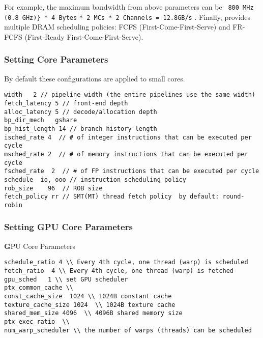 For example, the maximum bandwidth from above parameters can be
\Verb+ 800 MHz (0.8 GHz)} * 4 Bytes+
  \Verb+* 2 MCs * 2 Channels = 12.8GB/s+ . Finally, \SIM provides
  multiple DRAM scheduling policies: FCFS (First-Come-First-Serve) and
  FR-FCFS (First-Ready First-Come-First-Serve).


\subsubsection{Setting \cpu Core Parameters}

By default these configurations are applied to small cores. 

\begin{Verbatim}
width   2 // pipeline width (the entire pipelines use the same width) 
fetch_latency 5 // front-end depth 
alloc_latency 5 // decode/allocation depth  
bp_dir_mech   gshare 
bp_hist_length 14 // branch history length 
isched_rate 4  // # of integer instructions that can be executed per cycle 
msched_rate 2  // # of memory instructions that can be executed per cycle 
fsched_rate  2  // # of FP instructions that can be executed per cycle 
schedule  io, ooo // instruction scheduling policy 
rob_size    96  // ROB size
fetch_policy rr // SMT(MT) thread fetch policy  by default: round-robin 
\end{Verbatim}


\subsubsection{Setting GPU Core Parameters}
{\textbf GPU Core Parameters} 



\begin{Verbatim}
schedule_ratio 4 \\ Every 4th cycle, one thread (warp) is scheduled 
fetch_ratio  4 \\ Every 4th cycle, one thread (warp) is fetched 
gpu_sched   1 \\ set GPU scheduler 
ptx_common_cache \\ 
const_cache_size  1024 \\ 1024B constant cache  
texture_cache_size 1024  \\ 1024B texture cache
shared_mem_size 4096  \\ 4096B shared memory size 
ptx_exec_ratio  \\ 
num_warp_scheduler \\ the number of warps (threads) can be scheduled  
\end{Verbatim}








